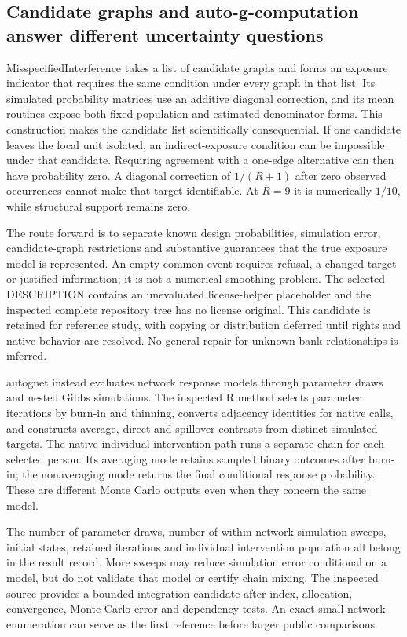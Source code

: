 \subsection{Candidate graphs and auto-g-computation answer different uncertainty questions}

MisspecifiedInterference takes a list of candidate graphs and forms an exposure indicator that requires the same condition under every graph in that list. Its simulated probability matrices use an additive diagonal correction, and its mean routines expose both fixed-population and estimated-denominator forms. This construction makes the candidate list scientifically consequential. If one candidate leaves the focal unit isolated, an indirect-exposure condition can be impossible under that candidate. Requiring agreement with a one-edge alternative can then have probability zero. A diagonal correction of $1/(R+1)$ after zero observed occurrences cannot make that target identifiable. At $R=9$ it is numerically $1/10$, while structural support remains zero.~\citep{exec25_rnet_nmr,exec25_rnet_choice}

The route forward is to separate known design probabilities, simulation error, candidate-graph restrictions and substantive guarantees that the true exposure model is represented. An empty common event requires refusal, a changed target or justified information; it is not a numerical smoothing problem. The selected DESCRIPTION contains an unevaluated license-helper placeholder and the inspected complete repository tree has no license original. This candidate is retained for reference study, with copying or distribution deferred until rights and native behavior are resolved. No general repair for unknown bank relationships is inferred.~\citep{exec25_rnet_nmr}

autognet instead evaluates network response models through parameter draws and nested Gibbs simulations. The inspected R method selects parameter iterations by burn-in and thinning, converts adjacency identities for native calls, and constructs average, direct and spillover contrasts from distinct simulated targets. The native individual-intervention path runs a separate chain for each selected person. Its averaging mode retains sampled binary outcomes after burn-in; the nonaveraging mode returns the final conditional response probability. These are different Monte Carlo outputs even when they concern the same model.~\citep{exec25_rnet_auto}

The number of parameter draws, number of within-network simulation sweeps, initial states, retained iterations and individual intervention population all belong in the result record. More sweeps may reduce simulation error conditional on a model, but do not validate that model or certify chain mixing. The inspected source provides a bounded integration candidate after index, allocation, convergence, Monte Carlo error and dependency tests. An exact small-network enumeration can serve as the first reference before larger public comparisons.~\citep{exec25_rnet_auto,exec25_rnet_choice}

